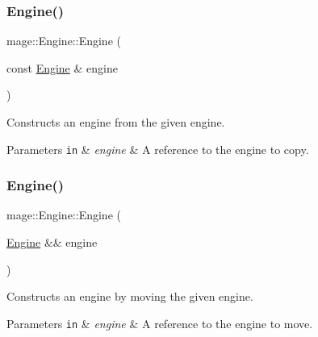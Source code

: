 \subsubsection{\texorpdfstring{Engine()}{Engine()}\hspace{0.1cm}{\footnotesize\ttfamily [2/3]}}
{\footnotesize\ttfamily mage\+::\+Engine\+::\+Engine (\begin{DoxyParamCaption}\item[{const \hyperlink{classmage_1_1_engine}{Engine} \&}]{engine }\end{DoxyParamCaption})\hspace{0.3cm}{\ttfamily [delete]}}

Constructs an engine from the given engine.


\begin{DoxyParams}[1]{Parameters}
\mbox{\tt in}  & {\em engine} & A reference to the engine to copy. \\
\hline
\end{DoxyParams}
\hypertarget{classmage_1_1_engine_a275b668202a24e639ebe3056a1c845a3}{}\label{classmage_1_1_engine_a275b668202a24e639ebe3056a1c845a3} 
\subsubsection{\texorpdfstring{Engine()}{Engine()}\hspace{0.1cm}{\footnotesize\ttfamily [3/3]}}
{\footnotesize\ttfamily mage\+::\+Engine\+::\+Engine (\begin{DoxyParamCaption}\item[{\hyperlink{classmage_1_1_engine}{Engine} \&\&}]{engine }\end{DoxyParamCaption})\hspace{0.3cm}{\ttfamily [delete]}}

Constructs an engine by moving the given engine.


\begin{DoxyParams}[1]{Parameters}
\mbox{\tt in}  & {\em engine} & A reference to the engine to move. \\
\hline
\end{DoxyParams}
\hypertarget{classmage_1_1_engine_a34628556f8397d70ed018d71e343c2f5}{}\label{classmage_1_1_engine_a34628556f8397d70ed018d71e343c2f5} 
